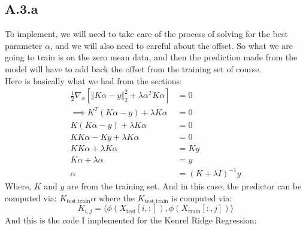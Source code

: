 \documentclass[]{article}
\begin{document}
    \subsection*{A.3.a}
        To implement, we will need to take care of the process of solving for the best parameter $\alpha$, and we will also need to careful about the offset. So what we are going to train is on the zero mean data, and then the prediction made from the model will have to add back the offset from the training set of course. 
        \\
        Here is basically what we had from the sections: 
        \begin{align*}\tag{A.3.a}\label{eqn:A.3.a}
            \frac{1}{2}\nabla_x[\Vert K\alpha - y\Vert_2^2 + \lambda \alpha^T K \alpha] &= 0
            \\
            \implies K^T(K\alpha - y) + \lambda K\alpha &= 0
            \\
            K(K\alpha - y) + \lambda K\alpha &= 0
            \\
            KK\alpha - Ky + \lambda K\alpha &= 0
            \\
            KK\alpha + \lambda K\alpha &= Ky
            \\
            K \alpha + \lambda \alpha &= y
            \\
            \alpha &= (K + \lambda I)^{-1}y
        \end{align*}
        Where, $K$ and $y$ are from the training set. And in this case, the predictor can be computed via: $K_{\text{test}, \text{train}}\alpha$ where the $K_{\text{test}, \text{train}}$ is computed via: 
        $$
            K_{i, j} = \langle \phi(X_{\text{test}}[i, :]), 
                                \phi(X_{\text{train}}[:, j]) 
            \rangle
        $$
        And this is the code I implemented for the Kenrel Ridge Regression: 
\end{document}
